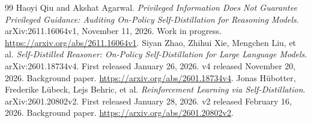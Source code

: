 \documentclass[11pt,a4paper]{article}
\begin{document}
\begin{thebibliography}{99}
 Haoyi Qiu and Akshat Agarwal. \textit{Privileged Information Does Not Guarantee Privileged Guidance: Auditing On-Policy Self-Distillation for Reasoning Models}. arXiv:2611.16064v1, November 11, 2026. Work in progress. \url{https://arxiv.org/abs/2611.16064v1}.
 Siyan Zhao, Zhihui Xie, Mengchen Liu, et al. \textit{Self-Distilled Reasoner: On-Policy Self-Distillation for Large Language Models}. arXiv:2601.18734v4. First released January 26, 2026. v4 released November 20, 2026. Background paper. \url{https://arxiv.org/abs/2601.18734v4}.
 Jonas H\"ubotter, Frederike L\"ubeck, Lejs Behric, et al. \textit{Reinforcement Learning via Self-Distillation}. arXiv:2601.20802v2. First released January 28, 2026. v2 released February 16, 2026. Background paper. \url{https://arxiv.org/abs/2601.20802v2}.
\end{thebibliography}
\end{document}
